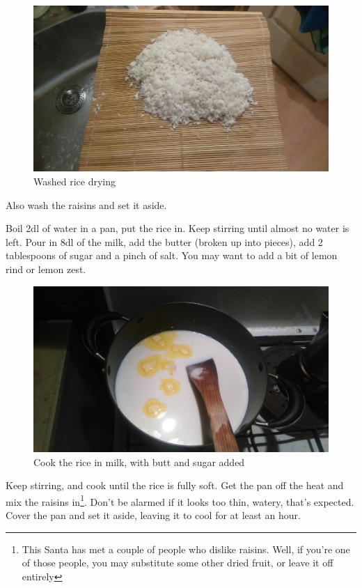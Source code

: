 \documentclass{article}
\begin{document}
\begin{figure}[!htbp]
\includegraphics[width=\textwidth]{rizskoch_02}
\caption{Washed rice drying}
\end{figure}

Also wash the raisins and set it aside.

Boil 2dl of water in a pan, put the rice in. Keep stirring until almost no water is left. Pour in 8dl of the milk, add the butter (broken up into pieces), add 2 tablespoons of sugar and a pinch of salt. You may want to add a bit of lemon rind or lemon zest.

\begin{figure}[!htbp]
\includegraphics[width=\textwidth]{rizskoch_04}
\caption{Cook the rice in milk, with butt and sugar added}
\end{figure}

Keep stirring, and cook until the rice is fully soft. Get the pan off the heat and mix the raisins in\footnote{This Santa has met a couple of people who dislike raisins. Well, if you're one of those people, you may substitute some other dried fruit, or leave it off entirely}. Don't be alarmed if it looks too thin, watery, that's expected. Cover the pan and set it aside, leaving it to cool for at least an hour.
\end{document}
